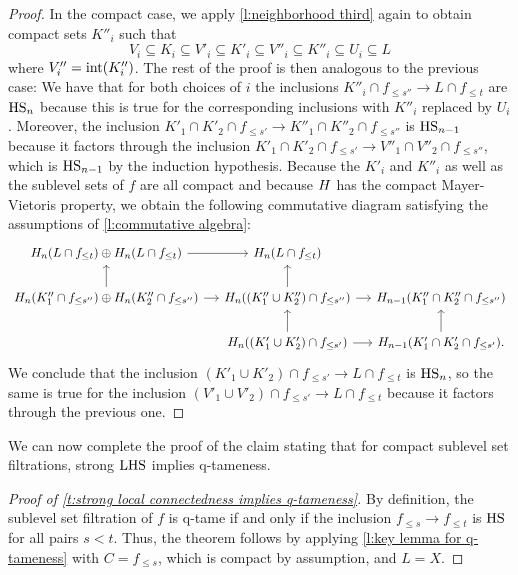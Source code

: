 \begin{proof}
	In the compact case, we apply \cref{l:neighborhood third} again to obtain compact sets $K''_i$ such that
	\begin{equation*}
	V_i \subseteq K_i \subseteq V'_i \subseteq K'_i \subseteq V''_i \subseteq K''_i \subseteq U_i \subseteq L
	\end{equation*}
	where $V''_i = \operatorname{int}(K''_i)$.
	The rest of the proof is then analogous to the previous case:
	We have that for both choices of $i$ the inclusions
	$K''_i \cap f_{\leq s''} \to L \cap f_{\leq t}$
	are $\mathrm{HS}_n$ because this is true for the corresponding inclusions with $K''_i$ replaced by $U_i$.
	Moreover, the inclusion
	$K'_1 \cap K'_2 \cap f_{\leq s'} \to K''_1 \cap K''_2 \cap f_{\leq s''}$
	is $\mathrm{HS}_{n-1}$ because it factors through the inclusion
	$K'_1 \cap K'_2 \cap f_{\leq s'} \to V''_1 \cap V''_2 \cap f_{\leq s''}$,
	which is $\mathrm{HS}_{n-1}$ by the induction hypothesis.
	Because the $K'_i$ and $K''_i$ as well as the sublevel sets of $f$ are all compact and because $H$ has the compact Mayer-Vietoris property, we obtain the following commutative diagram satisfying the assumptions of \cref{l:commutative algebra}:
	\begin{equation*}
	\begin{tikzcd}[column sep=small]
	\H_n(L \cap f_{\leq t}) \oplus \H_n(L \cap f_{\leq t}) \arrow[r] &
	\H_n(L \cap f_{\leq t}) & \\
	\H_{n}(K''_1 \cap f_{\leq s''}) \oplus \H_n(K''_2 \cap f_{\leq s''}) \arrow[r] \arrow[u] & 
	\H_{n}((K''_1 \cup K''_2) \cap f_{\leq s''}) \arrow[r] \arrow[u] &
	\H_{n-1}(K''_1 \cap K''_2 \cap f_{\leq s''}) \\ & 
	\H_{n}((K'_1 \cup K'_2) \cap f_{\leq s'}) \arrow[r] \arrow[u] &
	\H_{n-1}(K'_1 \cap K'_2 \cap f_{\leq s'}). \arrow[u]
	\end{tikzcd}
	\end{equation*}
	We conclude that the inclusion 
	$\left(K'_1 \cup K'_2 \right) \cap f_{\leq s'} \to L \cap f_{\leq t}$
	is $\mathrm{HS}_n$, so the same is true for the inclusion
	$\left(V'_1 \cup V'_2 \right) \cap f_{\leq s'} \to L \cap f_{\leq t}$ 
	because it factors through the previous one.
\end{proof}

We can now complete the proof of the claim stating that for compact sublevel set filtrations, strong $\mathrm{LHS}$ implies q-tameness.

\begin{proof}[Proof of \cref{t:strong local connectedness implies q-tameness}]
    By definition, the sublevel set filtration of $f$ is q-tame if and only if the inclusion $f_{\leq s} \to f_{\leq t}$ is $\mathrm{HS}$ for all pairs $s < t$.
    Thus, the theorem follows by applying \cref{l:key lemma for q-tameness} with $C = f_{\leq s}$, which is compact by assumption, and $L = X$.
\end{proof}

